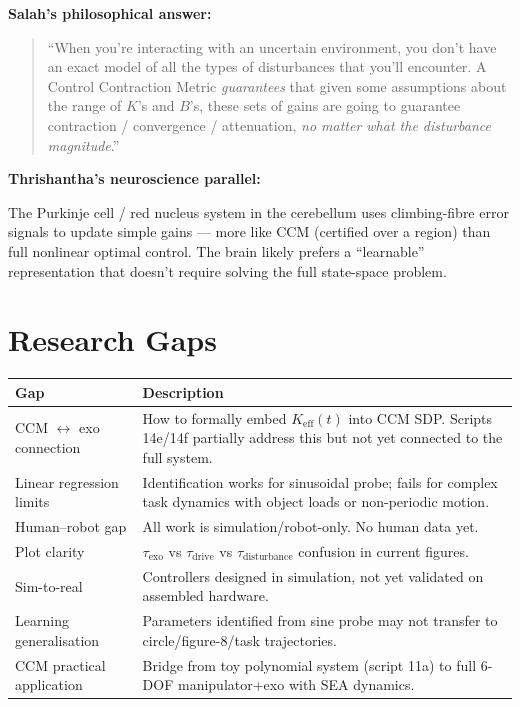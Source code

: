 \documentclass[11pt, a4paper]{article}
\newcommand{\Ke}{K_{\mathrm{eff}}}
\begin{document}
\textbf{Salah's philosophical answer:}
\begin{quote}
``When you're interacting with an uncertain environment, you don't have an exact model of
all the types of disturbances that you'll encounter.
A Control Contraction Metric \emph{guarantees} that given some assumptions about the range
of $K$'s and $B$'s, these sets of gains are going to guarantee contraction / convergence /
attenuation, \emph{no matter what the disturbance magnitude}.''
\end{quote}

\textbf{Thrishantha's neuroscience parallel:}

The Purkinje cell / red nucleus system in the cerebellum uses climbing-fibre error signals
to update simple gains --- more like CCM (certified over a region) than full nonlinear
optimal control. The brain likely prefers a ``learnable'' representation that doesn't
require solving the full state-space problem.

\section{Research Gaps}

\begin{center}
{\small
\begin{tabular}{p{3.8cm}p{8.5cm}}
\toprule
\textbf{Gap} & \textbf{Description} \\
\midrule
CCM $\leftrightarrow$ exo connection &
  How to formally embed $\Ke(t)$ into CCM SDP.
  Scripts 14e/14f partially address this but not yet connected to the full system. \\[4pt]
Linear regression limits &
  Identification works for sinusoidal probe; fails for complex task dynamics
  with object loads or non-periodic motion. \\[4pt]
Human--robot gap &
  All work is simulation/robot-only. No human data yet. \\[4pt]
Plot clarity &
  $\tau_{\mathrm{exo}}$ vs $\tau_{\mathrm{drive}}$ vs $\tau_{\mathrm{disturbance}}$
  confusion in current figures. \\[4pt]
Sim-to-real &
  Controllers designed in simulation, not yet validated on assembled hardware. \\[4pt]
Learning generalisation &
  Parameters identified from sine probe may not transfer to
  circle/figure-8/task trajectories. \\[4pt]
CCM practical application &
  Bridge from toy polynomial system (script 11a) to
  full 6-DOF manipulator+exo with SEA dynamics. \\
\bottomrule
\end{tabular}
}
\end{center}
\end{document}
